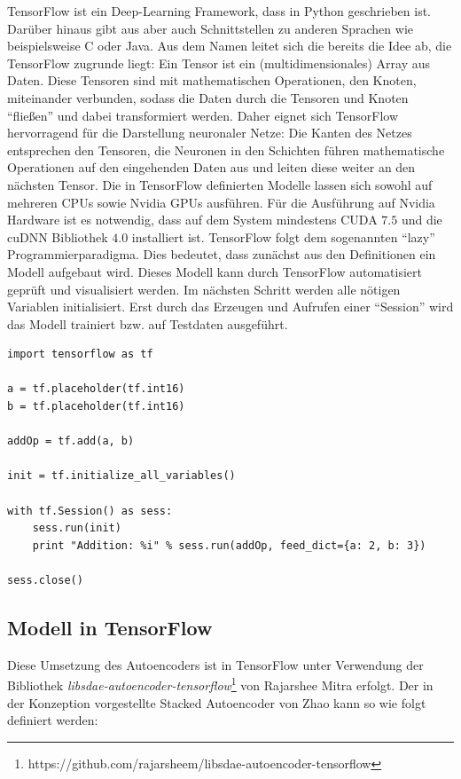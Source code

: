 TensorFlow ist ein Deep-Learning Framework, dass in Python geschrieben ist. Darüber hinaus gibt aus aber auch Schnittstellen zu anderen Sprachen wie beispielsweise C oder Java. Aus dem Namen leitet sich die bereits die Idee ab, die TensorFlow zugrunde liegt: Ein Tensor ist ein (multidimensionales) Array aus Daten. Diese Tensoren sind mit mathematischen Operationen, den Knoten, miteinander verbunden, sodass die Daten durch die Tensoren und Knoten \enquote{fließen} und dabei transformiert werden. Daher eignet sich TensorFlow hervorragend für die Darstellung neuronaler Netze: Die Kanten des Netzes entsprechen den Tensoren, die Neuronen in den Schichten führen mathematische Operationen auf den eingehenden Daten aus und leiten diese weiter an den nächsten Tensor. Die in TensorFlow definierten Modelle lassen sich sowohl auf mehreren CPUs sowie Nvidia GPUs ausführen. Für die Ausführung auf Nvidia Hardware ist es notwendig, dass auf dem System mindestens CUDA $7.5$ und die cuDNN Bibliothek $4.0$ installiert ist. 
TensorFlow folgt dem sogenannten \enquote{lazy} Programmierparadigma. Dies bedeutet, dass zunächst aus den Definitionen ein Modell aufgebaut wird. Dieses Modell kann durch TensorFlow automatisiert geprüft und visualisiert werden. Im nächsten Schritt werden alle nötigen Variablen initialisiert. Erst durch das Erzeugen und Aufrufen einer \enquote{Session} wird das Modell trainiert bzw. auf Testdaten ausgeführt.

\lstset{language=Python}
\begin{lstlisting}
import tensorflow as tf

a = tf.placeholder(tf.int16)
b = tf.placeholder(tf.int16)

addOp = tf.add(a, b)

init = tf.initialize_all_variables()

with tf.Session() as sess:
    sess.run(init)
    print "Addition: %i" % sess.run(addOp, feed_dict={a: 2, b: 3})

sess.close()
\end{lstlisting}

\subsection{Modell in TensorFlow}

Diese Umsetzung des Autoencoders ist in TensorFlow unter Verwendung der Bibliothek \textit{libsdae-autoencoder-tensorflow}\footnote{https://github.com/rajarsheem/libsdae-autoencoder-tensorflow} von Rajarshee Mitra erfolgt. Der in der Konzeption vorgestellte Stacked Autoencoder von Zhao kann so wie folgt definiert werden:

